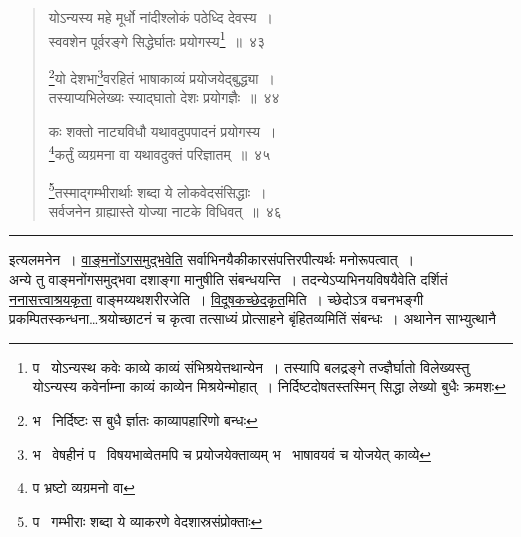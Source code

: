 \documentclass[11pt, openany]{book}
\begin{document}
\newpage

\begin{quote}
{\na योऽन्यस्य महे मूर्धो नांदीश्लोकं पठेध्दि देवस्य~।\\
स्ववशेन पूर्वरङ्गे सिद्धेर्घातः प्रयोगस्य\renewcommand{\thefootnote}{1}\footnote{प \textendash\  योऽन्यस्थ कवेः काव्ये काव्यं संभिश्रयेत्तथान्येन~। तस्यापि बलद्रङ्गे तज्ज्ञैर्घातो विलेख्यस्तु योऽन्यस्य कवेर्नाम्ना काव्यं काव्येन मिश्रयेन्मोहात्~। निर्दिष्टदोषतस्तस्मिन् सिद्धा लेख्यो बुधैः क्रमशः}~॥~४३

\renewcommand{\thefootnote}{2}\footnote{भ \textendash\  निर्दिष्टः स बुधै र्ज्ञातः काव्यापहारिणो बन्धः}यो देशभा\renewcommand{\thefootnote}{3}\footnote{भ \textendash\  वेषहीनं प \textendash\  विषयभाव्वेतमपि च प्रयोजयेक्ताव्यम् भ \textendash\  भाषावयवं च योजयेत् काव्ये}वरहितं भाषाकाव्यं प्रयोजयेद्बुद्ध्या~।\\
तस्याप्यभिलेख्यः स्याद्घातो देशः प्रयोगज्ञैः~॥~४४

कः शक्तो नाट्यविधौ यथावदुपपादनं प्रयोगस्य~।\\
\renewcommand{\thefootnote}{4}\footnote{प भ्रष्टो व्यग्रमनो वा}कर्तुं व्यग्रमना वा यथावदुक्तं परिज्ञातम्~॥~४५

\renewcommand{\thefootnote}{5}\footnote{प \textendash\  गम्भीराः शब्दा ये व्याकरणे वेदशास्रसंप्रोक्ताः}तस्माद्गम्भीरार्थाः शब्दा ये लोकवेदसंसिद्धाः~।\\
सर्वजनेन ग्राह्यास्ते योज्या नाटके विधिवत्~॥~४६}
\end{quote}

\hrule

\vspace{2mm}
\noindent
इत्यलमनेन~। \underline{वाङ्मनोंऽगसमुद्भवेति} सर्वाभिनयैकीकारसंपत्तिरपीत्यर्थः मनोरूपत्वात्~।\\

अन्ये तु वाङ्मनोंगसमुद्भवा दशाङ्गा मानुषीति संबन्धयन्ति~। तदन्येऽप्यभिनयविषयैवेति दर्शितं \underline{ननासत्त्वाश्रयकृता} वाङ्मय्यथशरीरजेति~। \underline{विदूषकच्छेदकृत}मिति~। च्छेदोऽत्र वचनभङ्गी प्रकम्पितस्कन्धना\ldots श्रयोच्छाटनं च कृत्वा तत्साध्यं प्रोत्साहने बृंहितव्यमितिं संबन्धः~। अथानेन साभ्युत्थानै\textendash

\newpage
\end{document}
